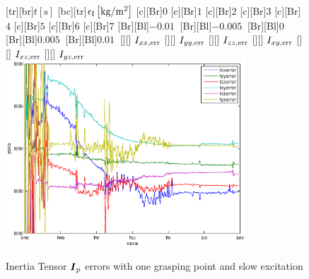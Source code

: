\begin{figure}
	\centering	
	[tr][br]{$t\left[\mathrm{s}\right]$}
	[bc][tr]{$\epsilon_{\mathrm{I}}\left[\mathrm{kg}/\mathrm{m}^2\right]$}
	[Br]{$0$}
	[Br]{$1$}
	[Br]{$2$}
	[Br]{$3$}
	[Br]{$4$}
	[Br]{$5$}
	[Br]{$6$}
	[Br]{$7$}
	[Br][Bl]{$-0.01\  $}
	[Br][Bl]{$-0.005\ $}
	[Br][Bl]{$0\  $}
	[Br][Bl]{$0.005\  $}
	[Br][Bl]{$0.01\  $}
	[][]{\tiny \hspace{0.5cm} $I_{xx,\mathrm{err}}$}
	[][]{\tiny \hspace{0.5cm} $I_{yy,\mathrm{err}}$}
	[][]{\tiny \hspace{0.5cm} $I_{zz,\mathrm{err}}$}
	[][]{\tiny \hspace{0.5cm} $I_{xy,\mathrm{err}}$}
	[][]{\tiny \hspace{0.5cm} $I_{xz,\mathrm{err}}$}
	[][]{\tiny \hspace{0.5cm} $I_{yz,\mathrm{err}}$}
	\includegraphics[width=0.8\textwidth]{figures/one_grasping_point_slow_inertias.eps}
	\vspace{0.2cm}
	\caption[Inertia errors, one grasping point, slow excitation]{Inertia Tensor $\boldsymbol{I}_{\mathrm{p}}$ errors with one grasping point and slow excitation}
	\label{fig:estim_inertia_one_slow}
\end{figure}

